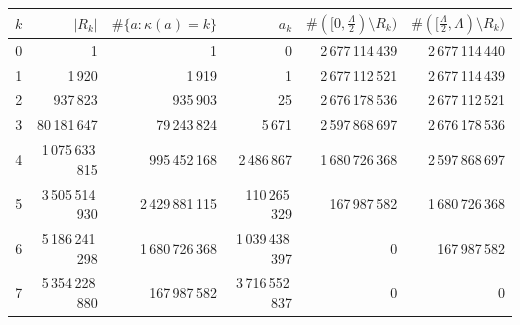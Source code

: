 \begin{tabular}{rrrrrr}
\toprule
$k$ & $|R_k|$ & $\#\{a:\kappa(a)=k\}$ & $a_k$ & $\#([0,\frac{\Lambda}{2})\setminus R_k)$ & $\#([\frac{\Lambda}{2},\Lambda)\setminus R_k)$\\
\midrule
0 & 1 & 1 & 0 & 2\,677\,114\,439 & 2\,677\,114\,440\\
1 & 1\,920 & 1\,919 & 1 & 2\,677\,112\,521 & 2\,677\,114\,439\\
2 & 937\,823 & 935\,903 & 25 & 2\,676\,178\,536 & 2\,677\,112\,521\\
3 & 80\,181\,647 & 79\,243\,824 & 5\,671 & 2\,597\,868\,697 & 2\,676\,178\,536\\
4 & 1\,075\,633\,815 & 995\,452\,168 & 2\,486\,867 & 1\,680\,726\,368 & 2\,597\,868\,697\\
5 & 3\,505\,514\,930 & 2\,429\,881\,115 & 110\,265\,329 & 167\,987\,582 & 1\,680\,726\,368\\
6 & 5\,186\,241\,298 & 1\,680\,726\,368 & 1\,039\,438\,397 & 0 & 167\,987\,582\\
7 & 5\,354\,228\,880 & 167\,987\,582 & 3\,716\,552\,837 & 0 & 0\\
\bottomrule
\end{tabular}